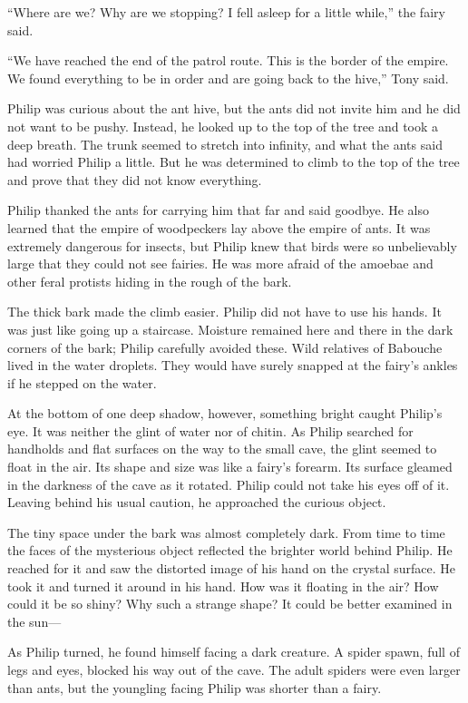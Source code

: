 \documentclass[10pt, draft]{memoir}
\begin{document}
``Where are we? Why are we stopping? I fell asleep for a little while,'' the
fairy said.

``We have reached the end of the patrol route. This is the border of the
empire. We found everything to be in order and are going back to the hive,''
Tony said.

Philip was curious about the ant hive, but the ants did not invite him and he
did not want to be pushy. Instead, he looked up to the top of the tree and took
a deep breath. The trunk seemed to stretch into infinity, and what the ants
said had worried Philip a little. But he was determined to climb to the top of
the tree and prove that they did not know everything.

Philip thanked the ants for carrying him that far and said goodbye. He also
learned that the empire of woodpeckers lay above the empire of ants. It was
extremely dangerous for insects, but Philip knew that birds were so
unbelievably large that they could not see fairies. He was more afraid of the
amoebae and other feral protists hiding in the rough of the bark.

The thick bark made the climb easier. Philip did not have to use his hands. It
was just like going up a staircase. Moisture remained here and there in the
dark corners of the bark; Philip carefully avoided these. Wild relatives of
Babouche lived in the water droplets. They would have surely snapped at the
fairy's ankles if he stepped on the water.

At the bottom of one deep shadow, however, something bright caught Philip's
eye. It was neither the glint of water nor of chitin. As Philip searched for
handholds and flat surfaces on the way to the small cave, the glint seemed to
float in the air. Its shape and size was like a fairy's forearm. Its surface
gleamed in the darkness of the cave as it rotated. Philip could not take his
eyes off of it. Leaving behind his usual caution, he approached the curious
object.

The tiny space under the bark was almost completely dark. From time to time the
faces of the mysterious object reflected the brighter world behind Philip. He
reached for it and saw the distorted image of his hand on the crystal surface.
He took it and turned it around in his hand. How was it floating in the air?
How could it be so shiny? Why such a strange shape? It could be better examined
in the sun---

As Philip turned, he found himself facing a dark creature. A spider spawn, full
of legs and eyes, blocked his way out of the cave. The adult spiders were even
larger than ants, but the youngling facing Philip was shorter than a fairy.
\end{document}
